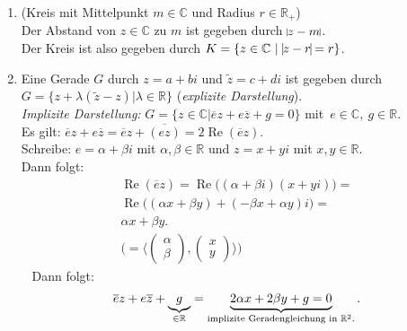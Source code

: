 	\begin{enumerate}
	\item (Kreis mit Mittelpunkt $m\in\mathbb{C}$ und Radius $r\in\mathbb{R}_+$)\\
	Der Abstand von $z\in\mathbb{C}$ zu $m$ ist gegeben durch $\vline z-m \vline$.\\
	Der Kreis ist also gegeben durch $K=\{ z\in\mathbb{C}~|~\vline z-r \vline = r \}$.
	
	\item Eine Gerade $G$ durch $z=a+bi$ und $\tilde{z}=c+di$ ist gegeben durch 
	$G=\{z+\lambda(\tilde{z}-z)|\lambda\in\mathbb{R} \}$ (\textit{explizite Darstellung}).\\ \newline
	\textit{Implizite Darstellung:} $G=\{z\in\mathbb{C}|\overline{e}z+e\overline{z}+g=0\}$
	\mbox{mit $e\in\mathbb{C},~g\in\mathbb{R}$}.\\
	Es gilt: $\overline{e}z+e\overline{z}=\overline{e}z+\overline{(ez)}=2\operatorname{Re}(\overline{e}z)$.\\
	Schreibe: $e=\alpha+\beta i$ mit $\alpha,\beta\in\mathbb{R}$ und $z=x+yi$ mit $x,y\in\mathbb{R}$.\\
	Dann folgt: 
	\begin{equation*}\begin{gathered}
	\operatorname{Re}(\overline{e}z)=\operatorname{Re}\big( (\alpha+\beta i)(x+yi) \big)=\\
	\operatorname{Re}\big( (\alpha x+\beta y)+(-\beta x+\alpha y)i \big)=\\
	\alpha x+\beta y.\\
	\Bigg(= \Bigg \langle 
	\left(\begin{array}{c}\alpha\\ \beta \end{array}\right),
	\left(\begin{array}{c} x\\y\end{array}\right)
	\Bigg \rangle\Bigg)
	\end{gathered}\end{equation*}
	~\newline		
	Dann folgt:
	\begin{align*}
	\overline{e}z+e\overline{z}+\underbrace{g}_{\in\mathbb{R}}=
	\underbrace{2\alpha x+2\beta y+g=0}_{\textnormal{implizite Geradengleichung in }\mathbb{R}^2.}.
	\end{align*}
	
	\end{enumerate}
	
